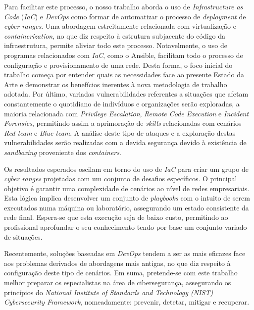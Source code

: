 Para facilitar este processo, o nosso trabalho aborda o uso de \textit{Infrastructure as Code} (\textit{IaC}) e \textit{DevOps} como formar de automatizar o processo de \textit{deployment} de \textit{cyber ranges}. Uma abordagem estreitamente relacionada com virtualização e \textit{containerization}, no que diz respeito à estrutura subjacente do código da infraestrutura, permite aliviar todo este processo. Notavelmente, o uso de programas relacionados com \textit{IaC}, como o Ansible, facilitam todo o processo de configuração e provisionamento de uma rede. Desta forma, o foco inicial do trabalho começa por entender quais as necessidades face ao presente Estado da Arte e demonstrar os benefícios inerentes à nova metodologia de trabalho adotada. Por último, variadas vulnerabilidades referentes a situações que afetam constantemente o quotidiano de indivíduos e organizações serão exploradas, a maioria relacionada com \textit{Privilege Escalation}, \textit{Remote Code Execution} e \textit{Incident Forensics}, permitindo assim a aprimoração de \textit{skills} relacionadas com cenários \textit{Red team} e \textit{Blue team}. A análise deste tipo de ataques e a exploração destas vulnerabilidades serão realizadas com a devida segurança devido à existência de \textit{sandboxing} proveniente dos \textit{containers}.

Os resultados esperados oscilam em torno do uso de \textit{IaC} para criar um grupo de \textit{cyber ranges} projetadas com um conjunto de desafios específicos. O principal objetivo é garantir uma complexidade de cenários ao nível de redes empresariais. Esta lógica implica desenvolver um conjunto de \textit{playbooks} com o intuito de serem executados numa máquina ou laboratório, assegurando um estado consistente da rede final. Espera-se que esta execução seja de baixo custo, permitindo ao profissional aprofundar o seu conhecimento tendo por base um conjunto variado de situações.

Recentemente, soluções baseadas em \textit{DevOps} tendem a ser as mais eficazes face aos problemas derivados de abordagens mais antigas, no que diz respeito à configuração deste tipo de cenários. Em suma, pretende-se com este trabalho melhor preparar os especialistas na área de cibersegurança, assegurando os princípios do \textit{National Institute of Standards and Technology (NIST) Cybersecurity Framework}, nomeadamente: prevenir, detetar, mitigar e recuperar. \\

